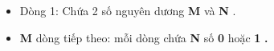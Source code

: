 \begin{itemize}
	\item     Dòng 1: Chứa 2 số nguyên dương    \textbf{     M    }    và    \textbf{     N    }    .   
	\item \textbf{     M    }    dòng tiếp theo: mỗi dòng chứa    \textbf{     N    }    số    \textbf{     0    }    hoặc    \textbf{     1    }\textbf{     .    }
\end{itemize}